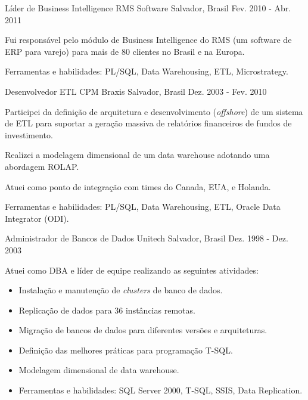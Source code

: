 \begin{cventries}

\cventry
{Líder de Business Intelligence} %
{RMS Software} %
{Salvador, Brasil} %
{Fev. 2010 - Abr. 2011} %
{ %
\begin{cvitems}
	\item{Fui responsável pelo módulo de Business Intelligence do RMS (um software de ERP para varejo) para mais de 80 clientes no Brasil e na Europa.}
	\item{Ferramentas e habilidades: PL/SQL, Data Warehousing, ETL, Microstrategy.}
\end{cvitems}
}


\cventry
{Desenvolvedor ETL} %
{CPM Braxis} %
{Salvador, Brasil} %
{Dez. 2003 - Fev. 2010} %
{ %
\begin{cvitems}
\item{Participei da definição de arquitetura e desenvolvimento (\textit{offshore}) de um sistema de ETL para suportar a geração massiva de relatórios financeiros de fundos de investimento.} 
\item{Realizei a modelagem dimensional de um data warehouse adotando uma abordagem ROLAP.}
\item{Atuei como ponto de integração com times do Canada, EUA, e Holanda.}
\item{Ferramentas e habilidades: PL/SQL, Data Warehousing, ETL, Oracle Data Integrator (ODI).}
\end{cvitems}
}


\cventry
{Administrador de Bancos de Dados} %
{Unitech} %
{Salvador, Brasil} %
{Dez. 1998 - Dez. 2003} %
{ %
\begin{cvitems}
	\item{Atuei como DBA e líder de equipe realizando as seguintes atividades:}
	\begin{itemize}	
		\item{Instalação e manutenção de \textit{clusters} de banco de dados.}
		\item{Replicação de dados para 36 instâncias remotas.} 
		\item{Migração de bancos de dados para diferentes versões e arquiteturas.}
		\item{Definição das melhores práticas para programação T-SQL.}
		\item{Modelagem dimensional de data warehouse.}
		\item{Ferramentas e habilidades: SQL Server 2000, T-SQL, SSIS, Data Replication.}
	\end{itemize}
\end{cvitems}
}


\end{cventries}
